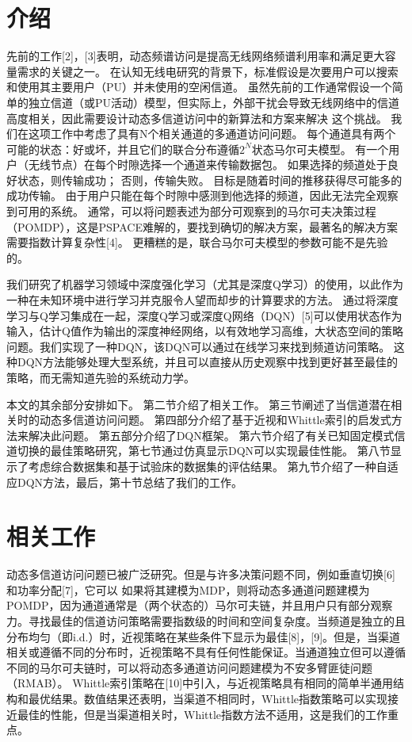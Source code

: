 \section{ 介绍 }
先前的工作[2]，[3]表明，动态频谱访问是提高无线网络频谱利用率和满足更大容量需求的关键之一。 在认知无线电研究的背景下，标准假设是次要用户可以搜索和使用其主要用户（PU）并未使用的空闲信道。 虽然先前的工作通常假设一个简单的独立信道（或PU活动）模型，但实际上，外部干扰会导致无线网络中的信道高度相关，因此需要设计动态多信道访问中的新算法和方案来解决 这个挑战。
我们在这项工作中考虑了具有N个相关通道的多通道访问问题。 每个通道具有两个可能的状态：好或坏，并且它们的联合分布遵循$2^{N}$状态马尔可夫模型。 有一个用户（无线节点）在每个时隙选择一个通道来传输数据包。 如果选择的频道处于良好状态，则传输成功； 否则，传输失败。 目标是随着时间的推移获得尽可能多的成功传输。 由于用户只能在每个时隙中感测到他选择的频道，因此无法完全观察到可用的系统。 通常，可以将问题表述为部分可观察到的马尔可夫决策过程（POMDP），这是PSPACE难解的，要找到确切的解决方案，最著名的解决方案需要指数计算复杂性[4]。 更糟糕的是，联合马尔可夫模型的参数可能不是先验的。

我们研究了机器学习领域中深度强化学习（尤其是深度Q学习）的使用，以此作为一种在未知环境中进行学习并克服令人望而却步的计算要求的方法。 通过将深度学习与Q学习集成在一起，深度Q学习或深度Q网络（DQN）[5]可以使用状态作为输入，估计Q值作为输出的深度神经网络，以有效地学习高维，大状态空间的策略 问题。我们实现了一种DQN，该DQN可以通过在线学习来找到频道访问策略。 这种DQN方法能够处理大型系统，并且可以直接从历史观察中找到更好甚至最佳的策略，而无需知道先验的系统动力学。

本文的其余部分安排如下。 第二节介绍了相关工作。 第三节阐述了当信道潜在相关时的动态多信道访问问题。 第四部分介绍了基于近视和Whittle索引的启发式方法来解决此问题。 第五部分介绍了DQN框架。 第六节介绍了有关已知固定模式信道切换的最佳策略研究，第七节通过仿真显示DQN可以实现最佳性能。 第八节显示了考虑综合数据集和基于试验床的数据集的评估结果。 第九节介绍了一种自适应DQN方法，最后，第十节总结了我们的工作。

\section{  相关工作  }
动态多信道访问问题已被广泛研究。但是与许多决策问题不同，例如垂直切换[6]和功率分配[7]，它可以
如果将其建模为MDP，则将动态多通道问题建模为POMDP，因为通道通常是（两个状态的）马尔可夫链，并且用户只有部分观察力。寻找最佳的信道访问策略需要指数级的时间和空间复杂度。当频道是独立的且分布均匀（即i.d.）时，近视策略在某些条件下显示为最佳[8]，[9]。但是，当渠道相关或遵循不同的分布时，近视策略不具有任何性能保证。当通道独立但可以遵循不同的马尔可夫链时，可以将动态多通道访问问题建模为不安多臂匪徒问题（RMAB）。 Whittle索引策略在[10]中引入，与近视策略具有相同的简单半通用结构和最优结果。数值结果还表明，当渠道不相同时，Whittle指数策略可以实现接近最佳的性能，但是当渠道相关时，Whittle指数方法不适用，这是我们的工作重点。

